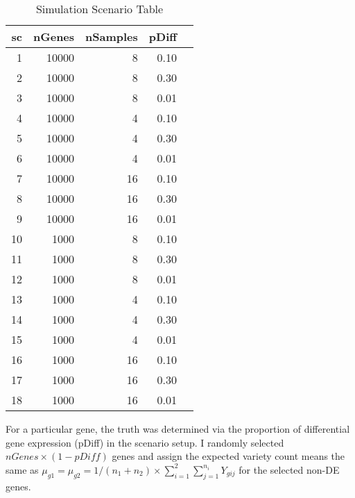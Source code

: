 \begin{table}[H]
\centering
\begin{tabular}{|r|r|r|r|r|}
\hline
sc & nGenes & nSamples & pDiff \\ 
\hline
1 & 10000 & 8 & 0.10 \\ 
\hline
2 & 10000 & 8 & 0.30 \\ 
\hline
3 & 10000 & 8 & 0.01 \\
\hline
4 & 10000 & 4 & 0.10 \\
\hline
5 & 10000 & 4 & 0.30 \\
\hline
6 & 10000 & 4 & 0.01 \\ 
\hline
7 & 10000 & 16 & 0.10 \\
\hline
8 & 10000 & 16 & 0.30 \\ 
\hline
9 & 10000 & 16 & 0.01 \\
\hline
10& 1000 & 8 & 0.10 \\
\hline
11 & 1000 & 8 & 0.30 \\
\hline
12 & 1000 & 8 & 0.01 \\ 
\hline
13 & 1000 & 4 & 0.10 \\
\hline
14 & 1000 & 4 & 0.30 \\
\hline
15 & 1000 & 4 & 0.01 \\ 
\hline
16 & 1000 & 16 & 0.10 \\
\hline
17 & 1000 & 16 & 0.30 \\ 
\hline
18 & 1000 & 16 & 0.01 \\ 
\hline
\end{tabular}
\caption{Simulation Scenario Table}
\label{tab:Scenario}
\end{table}

For a particular gene, the truth was determined via the proportion of differential gene expression (pDiff) in the scenario setup. I randomly selected $nGenes \times (1-pDiff)$ genes and assign the expected variety count means the same as $\mu_{g1} = \mu_{g2} = 1/(n_1+n_2)\times \sum_{i=1}^2 \sum_{j=1}^{n_i} Y_{gij}$ for the selected non-DE genes. 
